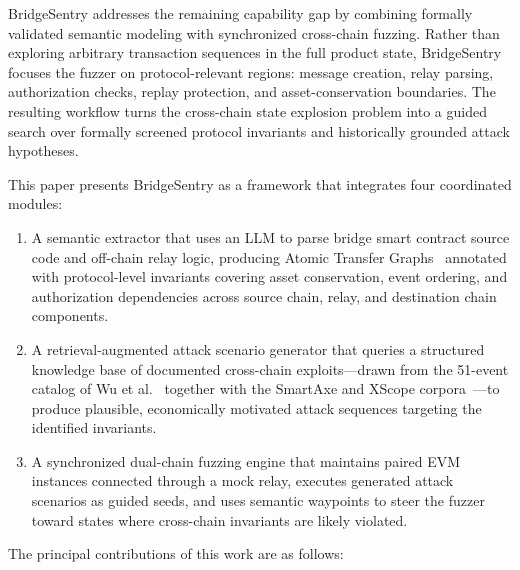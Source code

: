 \documentclass[journal]{IEEEtran}
\begin{document}
BridgeSentry addresses the remaining capability gap by combining formally validated semantic modeling with synchronized cross-chain fuzzing. Rather than exploring arbitrary transaction sequences in the full product state, BridgeSentry focuses the fuzzer on protocol-relevant regions: message creation, relay parsing, authorization checks, replay protection, and asset-conservation boundaries. The resulting workflow turns the cross-chain state explosion problem into a guided search over formally screened protocol invariants and historically grounded attack hypotheses.

This paper presents BridgeSentry as a framework that integrates four coordinated modules:

\begin{enumerate}
    \item A semantic extractor that uses an LLM to parse bridge smart contract source code and off-chain relay logic, producing Atomic Transfer Graphs~\cite{dubler2025atg} annotated with protocol-level invariants covering asset conservation, event ordering, and authorization dependencies across source chain, relay, and destination chain components.
    \item A retrieval-augmented attack scenario generator that queries a structured knowledge base of documented cross-chain exploits---drawn from the 51-event catalog of Wu et al.~\cite{wu2025safeguarding} together with the SmartAxe and XScope corpora~\cite{liao2024smartaxe, zhang2022xscope, augusto2024sok}---to produce plausible, economically motivated attack sequences targeting the identified invariants.
    \item A synchronized dual-chain fuzzing engine that maintains paired EVM instances connected through a mock relay, executes generated attack scenarios as guided seeds, and uses semantic waypoints to steer the fuzzer toward states where cross-chain invariants are likely violated.
\end{enumerate}

The principal contributions of this work are as follows:
\end{document}
